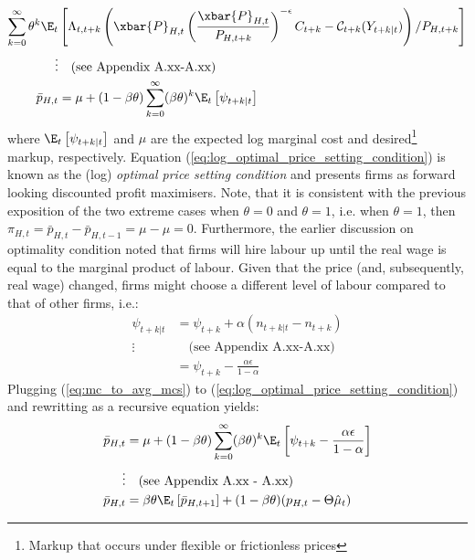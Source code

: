 \begin{align}
    \sum_{k=0}^{\infty} \theta^k \E_t &\left[\Lambda_{t,t+k} \left( \xbar{P}_{H,t} \left(\frac{\xbar{P}_{H,t}}{P_{H,t+k}}\right)^{-\epsilon} C_{t+k} - \mathcal{C}_{t+k}(Y_{t+k|t})\right) / P_{H,t+k} \right] \\
    \vdots & \quad \text{(see Appendix A.xx-A.xx)} \nonumber \\
    \bar{p}_{H,t} &= \mu + (1-\beta \theta) \sum_{k=0}^{\infty} (\beta \theta)^{k} \E_t \left[ \psi_{t+k|t} \right] \label{eq:log_optimal_price_setting_condition}
\end{align}
where $\E_t \left[ \psi_{t+k|t} \right]$ and $\mu$ are the expected log marginal cost and desired\footnote{Markup that occurs under flexible or frictionless prices} markup, respectively. Equation (\ref{eq:log_optimal_price_setting_condition}) is known as the (log) \textit{optimal price setting condition} and presents firms as forward looking discounted profit maximisers. Note, that it is consistent with the previous exposition of the two extreme cases when $\theta = 0$ and $\theta = 1$, i.e. when $\theta = 1$, then $\pi_{H,t} = \bar{p}_{H,t} - \bar{p}_{H,t-1} = \mu - \mu = 0$. Furthermore, the earlier discussion on optimality condition noted that firms will hire labour up until the real wage is equal to the marginal product of labour. Given that the price (and, subsequently, real wage) changed, firms might choose a different level of labour compared to that of other firms, i.e.:
\begin{align}
     \psi_{t+k|t} &=  \psi_{t+k} + \alpha(n_{t+k|t} - n_{t+k}) \\
     \vdots & \quad \text{(see Appendix A.xx-A.xx)} \nonumber \\
     &=\psi_{t+k} - \frac{\alpha \epsilon}{1-\alpha} \label{eq:mc_to_avg_mcs}
\end{align}
Plugging (\ref{eq:mc_to_avg_mcs}) to (\ref{eq:log_optimal_price_setting_condition}) and rewritting as a recursive equation yields:
\begin{align}
    \bar{p}_{H,t} &= \mu + (1-\beta \theta) \sum_{k=0}^{\infty} (\beta \theta)^{k} \E_t \left[ \psi_{t+k} - \frac{\alpha \epsilon}{1-\alpha} \right]\\
    \vdots & \quad \text{(see Appendix A.xx - A.xx)} \nonumber \\
    \bar{p}_{H,t} &= \beta \theta \E_t \left[ \bar{p}_{H,t+1} \right] + (1-\beta \theta)(p_{H,t} - \Theta \hat{\mu}_t) \label{eq:dynamic_price_recursive}
\end{align}
